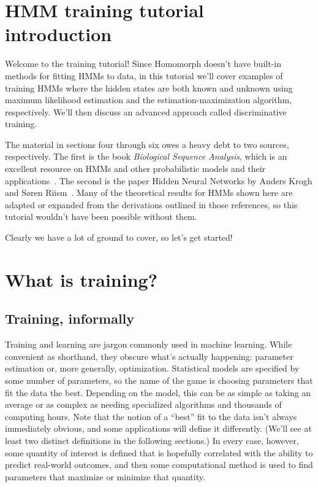 \section{HMM training tutorial introduction}
Welcome to the training tutorial! Since Homomorph doesn't have built-in methods for fitting HMMs to data, in this tutorial we'll cover examples of training HMMs where the hidden states are both known and unknown using maximum likelihood estimation and the estimation-maximization algorithm, respectively. We'll then discuss an advanced approach called discriminative training.

The material in sections four through six owes a heavy debt to two sources, respectively. The first is the book \textit{Biological Sequence Analysis}, which is an excellent resource on HMMs and other probabilistic models and their applications~\cite{Durbin1998}. The second is the paper Hidden Neural Networks by Anders Krogh and Søren Riism~\cite{Krogh1999}. Many of the theoretical results for HMMs shown here are adapted or expanded from the derivations outlined in those references, so this tutorial wouldn't have been possible without them.

Clearly we have a lot of ground to cover, so let's get started!

\section{What is training?}

\subsection{Training, informally}

Training and learning are jargon commonly used in machine learning. While convenient as shorthand, they obscure what's actually happening: parameter estimation or, more generally, optimization. Statistical models are specified by some number of parameters, so the name of the game is choosing parameters that fit the data the best. Depending on the model, this can be as simple as taking an average or as complex as needing specialized algorithms and thousands of computing hours. Note that the notion of a ``best'' fit to the data isn't always immediately obvious, and some applications will define it differently. (We'll see at least two distinct definitions in the following sections.) In every case, however, some quantity of interest is defined that is hopefully correlated with the ability to predict real-world outcomes, and then some computational method is used to find parameters that maximize or minimize that quantity.

